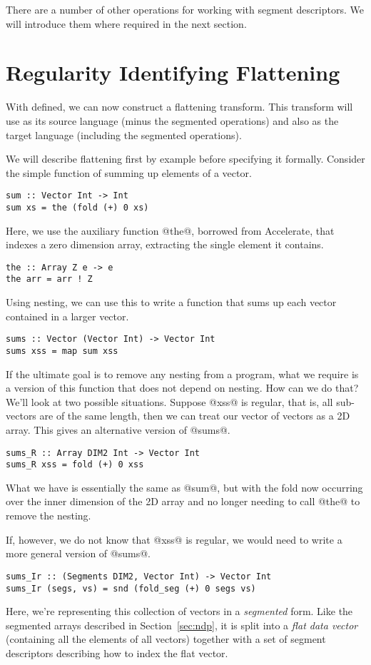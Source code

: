 There are a number of other operations for working with segment descriptors. We will introduce them where required in the next section.


\section{Regularity Identifying Flattening}
\label{sec:flattening}

With \ndp{} defined, we can now construct a flattening transform. This transform will use \ndp{} as its source language (minus the segmented operations) and also as the target language (including the segmented operations).

We will describe flattening first by example before specifying it formally. Consider the simple function of summing up elements of a vector.
%
\begin{lstlisting}[style=ndp]
sum :: Vector Int -> Int
sum xs = the (fold (+) 0 xs)
\end{lstlisting}
%
Here, we use the auxiliary function @the@, borrowed from Accelerate, that indexes a zero dimension array, extracting the single element it contains.
%
\begin{lstlisting}[style=ndp]
the :: Array Z e -> e
the arr = arr ! Z
\end{lstlisting}
%
Using nesting, we can use this to write a function that sums up each vector contained in a larger vector.
%
\begin{lstlisting}[style=ndp]
sums :: Vector (Vector Int) -> Vector Int
sums xss = map sum xss
\end{lstlisting}
%
If the ultimate goal is to remove any nesting from a program, what we require is a version of this function that does not depend on nesting. How can we do that? We'll look at two possible situations. Suppose @xss@ is regular, that is, all sub-vectors are of the same length, then we can treat our vector of vectors as a 2D array. This gives an alternative version of @sums@.
%
\begin{lstlisting}[style=ndp]
sums_R :: Array DIM2 Int -> Vector Int
sums_R xss = fold (+) 0 xss
\end{lstlisting}
%
What we have is essentially the same as @sum@, but with the fold now occurring over the inner dimension of the 2D array and no longer needing to call @the@ to remove the nesting.

If, however, we do not know that @xss@ is regular, we would need to write a more general version of @sums@.
%
\begin{lstlisting}[style=ndp]
sums_Ir :: (Segments DIM2, Vector Int) -> Vector Int
sums_Ir (segs, vs) = snd (fold_seg (+) 0 segs vs)
\end{lstlisting}
%
Here, we're representing this collection of vectors in a \emph{segmented} form. Like the segmented arrays described in Section~\ref{sec:ndp}, it is split into a \emph{flat data vector} (containing all the elements of all vectors) together with a set of segment descriptors describing how to index the flat vector.


